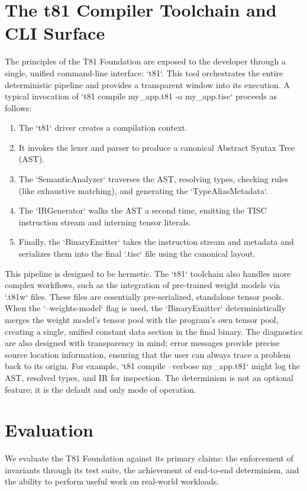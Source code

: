 \documentclass[sigconf, 10pt]{acmart}
\begin{document}
\section{The t81 Compiler Toolchain and CLI Surface}
The principles of the T81 Foundation are exposed to the developer through a single, unified command-line interface: `t81`. This tool orchestrates the entire deterministic pipeline and provides a transparent window into its execution. A typical invocation of `t81 compile my_app.t81 -o my_app.tisc` proceeds as follows:
\begin{enumerate}
\item The `t81` driver creates a compilation context.
\item It invokes the lexer and parser to produce a canonical Abstract Syntax Tree (AST).
\item The `SemanticAnalyzer` traverses the AST, resolving types, checking rules (like exhaustive matching), and generating the `TypeAliasMetadata`.
\item The `IRGenerator` walks the AST a second time, emitting the TISC instruction stream and interning tensor literals.
\item Finally, the `BinaryEmitter` takes the instruction stream and metadata and serializes them into the final `.tisc` file using the canonical layout.
\end{enumerate}
This pipeline is designed to be hermetic. The `t81` toolchain also handles more complex workflows, such as the integration of pre-trained weight models via `.t81w` files. These files are essentially pre-serialized, standalone tensor pools. When the `--weights-model` flag is used, the `BinaryEmitter` deterministically merges the weight model's tensor pool with the program's own tensor pool, creating a single, unified constant data section in the final binary. The diagnostics are also designed with transparency in mind; error messages provide precise source location information, ensuring that the user can always trace a problem back to its origin. For example, `t81 compile --verbose my_app.t81` might log the AST, resolved types, and IR for inspection. The determinism is not an optional feature; it is the default and only mode of operation.
\section{Evaluation}
We evaluate the T81 Foundation against its primary claims: the enforcement of invariants through its test suite, the achievement of end-to-end determinism, and the ability to perform useful work on real-world workloads.
\end{document}
